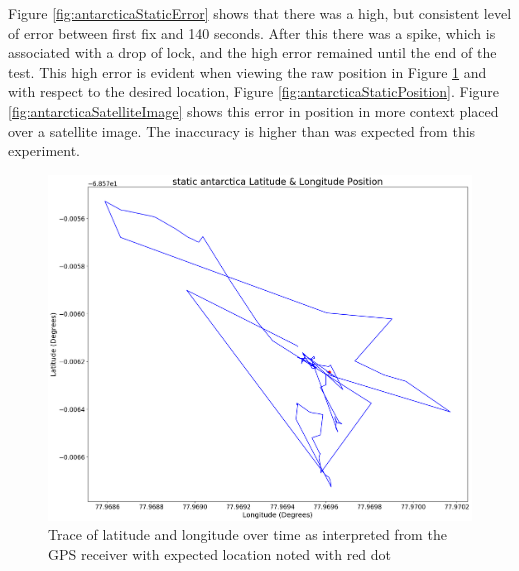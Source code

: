 Figure \ref{fig:antarcticaStaticError} shows that there was a high, but consistent level of error between first fix
and 140 seconds. After this there was a spike, which is associated with a drop of lock, and the high error remained until the end of the test. This high error is evident
when viewing the raw position in Figure \ref{fig:antarcticaStaticCoord} and with respect to the desired location, Figure \ref{fig:antarcticaStaticPosition}. Figure \ref{fig:antarcticaSatelliteImage} shows this error
in position in more context placed over a satellite image.
The inaccuracy is higher than was expected from this experiment.  

\begin{figure}[H]
    \begin{centering}
        \includegraphics[width=14cm,keepaspectratio]{Figures/2021_3_30_static_antarctica Lat long position.png}
        \caption{Trace of latitude and longitude over time as interpreted from the GPS receiver with expected location noted with red dot}
        \label{fig:antarcticaStaticCoord}
    \end{centering}
\end{figure}

